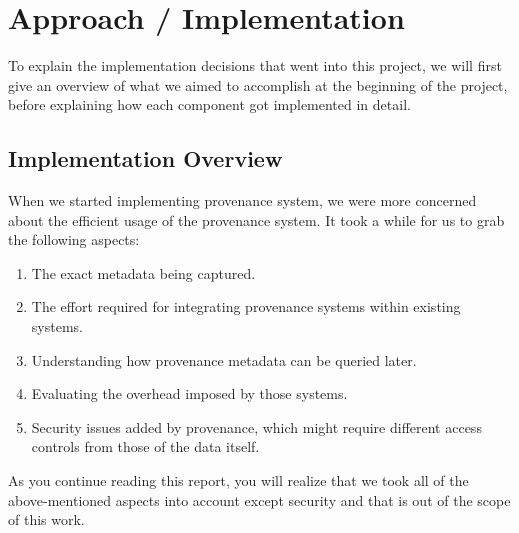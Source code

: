 
\chapter{Approach / Implementation}

To explain the implementation decisions that went into this project, we will first give an overview of what we aimed to accomplish at the beginning of the project, before explaining how each component got implemented in detail.

\section{Implementation Overview}
When we started implementing provenance system, we were more concerned about the efficient usage of the provenance system. It took a while for us to grab the following aspects:
\begin{enumerate}
	\item The exact metadata being captured. 
	\item The effort required for integrating provenance systems within existing systems.
	\item Understanding how provenance metadata can be queried later.
	\item Evaluating the overhead imposed by those systems.
	\item Security issues added by provenance, which might require different access controls from those of the data itself.
\end{enumerate}
As you continue reading this report, you will realize that we took all of the above-mentioned aspects into account except security and that is out of the scope of this work.


